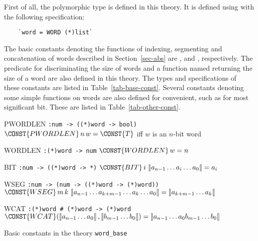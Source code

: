 First of all, the polymorphic type \word{*} is defined in this theory.
It is defined using  with the following
specification:
\begin{verbatim}
    `word = WORD (*)list`
\end{verbatim}
The basic constants denoting the functions of indexing, segmenting and
concatenation of words described in Section~\ref{sec-abs} are
,  and ,
respectively. The predicate  for discriminating the
size of words and a function named  returning the size
of a word are also defined in this theory. The types and specifications
of these constants are listed in Table~\ref{tab-base-const}.
Several constants denoting some simple functions on words
are also defined for convenient, such as  for most significant
bit. These are listed in Table~\ref{tab-other-const}.
\begin{table}
\begin{center}
\begin{constants}
\item[PWORDLEN]\verb":num -> ((*)word -> bool)" \newline
        $\CONST{PWORDLEN} \,n \,w = \CONST{T}$ iff $w$ is an $n$-bit word
\item[WORDLEN]\verb":(*)word -> num"\newline
        $\CONST{WORDLEN} \,w = n$
\item[BIT]\verb":num -> ((*)word -> *)"\newline
        $\CONST{BIT}\,i\, \nword{a_{n-1} \ldots a_i \ldots a_0} = a_i$
\item[WSEG]\verb":num -> (num -> ((*)word -> (*)word))" \newline
        $\CONST{WSEG}\,m\, k\,\nword{a_{n-1}\ldots a_{k+m-1}\ldots a_k\ldots a_0} =
         \nword{a_{k + m -1} \ldots a_k} $
\item[WCAT]\verb":(*)word # (*)word -> (*)word" \newline
        $\CONST{WCAT}(\nword{a_{n-1}\ldots a_0}, \nword{b_{m-1}\ldots b_0}) =
         \nword{a_{n-1}\ldots a_0 b_{m-1}\ldots b_0} $
\end{constants}
\end{center}
\caption{Basic constants in the theory {\tt word\_base}\label{tab-base-const}}
\end{table}
